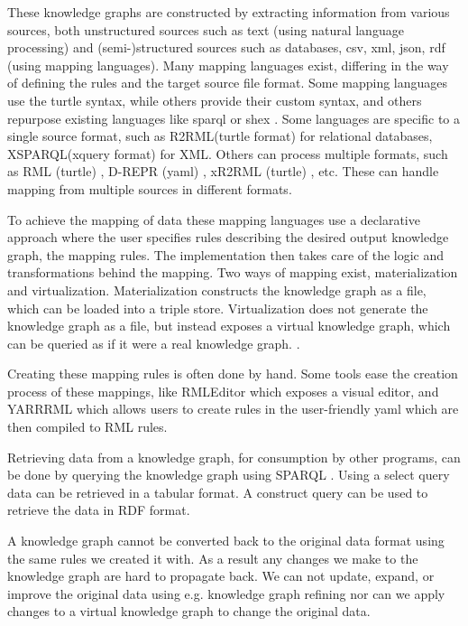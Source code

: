 These knowledge graphs are constructed by extracting information from various sources, both unstructured sources such as text (using natural language processing) and (semi-)structured sources such as databases, \acrshort{csv}, \acrshort{xml}, \acrshort{json}, \acrshort{rdf} (using mapping languages). Many mapping languages exist, differing in the way of defining the rules and the target source file format. Some mapping languages use the turtle syntax, while others provide their custom syntax, and others repurpose existing languages like \acrshort{sparql} or \acrshort{shex} \citep{VANASSCHE2023100753}. Some languages are specific to a single source format, such as R2RML(turtle format) \citep{Das:12:RRR} for relational databases, XSPARQL(\acrshort{xquery} format) \citep{Bischof2012} for XML. Others can process multiple formats, such as RML (turtle) \citep{dimou_ldow_2014}, D-REPR (\acrshort{yaml}) \citep{d-repr}, xR2RML (turtle) \citep{xR2RML}, etc. These can handle mapping from multiple sources in different formats.

To achieve the mapping of data these mapping languages use a declarative approach where the user specifies rules describing the desired output knowledge graph, the mapping rules. The implementation then takes care of the logic and transformations behind the mapping. Two ways of mapping exist, materialization and virtualization. Materialization constructs the knowledge graph as a file, which can be loaded into a triple store. Virtualization does not generate the knowledge graph as a file, but instead exposes a virtual knowledge graph, which can be queried as if it were a real knowledge graph. \citep{ontop}.

Creating these mapping rules is often done by hand. Some tools ease the creation process of these mappings, like RMLEditor \citep{heyvaert_jws_2018} which exposes a visual editor, and YARRRML \citep{10.1007/978-3-319-98192-5_40} which allows users to create rules in the user-friendly \acrshort{yaml} which are then compiled to RML rules. 

Retrieving data from a knowledge graph, for consumption by other programs, can be done by querying the knowledge graph using SPARQL \citep{Seaborne:08:SQL}. Using a select query data can be retrieved in a tabular format. A construct query can be used to retrieve the data in RDF format. 

A knowledge graph cannot be converted back to the original data format using the same rules we created it with. As a result any changes we make to the knowledge graph are hard to propagate back. We can not update, expand, or improve the original data using e.g. knowledge graph refining nor can we apply changes to a virtual knowledge graph to change the original data. 

